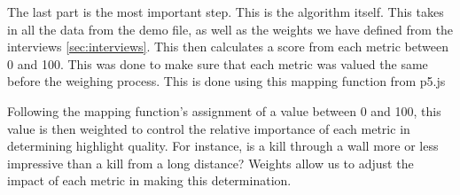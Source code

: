 The last part is the most important step. This is the algorithm itself. This takes in all the data from the demo file, as well as the weights we have defined from the interviews \ref{sec:interviews}. This then calculates a score from each metric between 0 and 100. This was done to make sure that each metric was valued the same before the weighing process. This is done using this mapping function from p5.js\cite{p5jsMap}


Following the mapping function's assignment of a value between 0 and 100, this value is then weighted to control the relative importance of each metric in determining highlight quality. For instance, is a kill through a wall more or less impressive than a kill from a long distance? Weights allow us to adjust the impact of each metric in making this determination.

